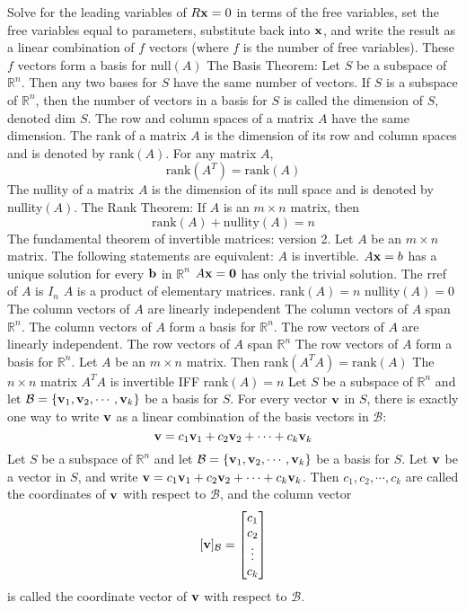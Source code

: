 \documentclass{article}
\begin{document}
\begin{outline}
            \2 Solve for the leading variables of \(R\vb x=0\) in terms of the free variables, set the free variables equal to parameters, substitute back into \(\vb x\), and write the result as a linear combination of $f$ vectors (where $f$ is the number of free variables). These $f$ vectors form a basis for null\((A)\)
        \1 The Basis Theorem: Let $S$ be a subspace of \(\mathbb R^n\). Then any two bases for $S$ have the same number of vectors. 
        \1 If $S$ is a subspace of \(\mathbb R^n\), then the number of vectors in a basis for $S$ is called the dimension of $S$, denoted dim $S$. 
        \1 The row and column spaces of a matrix $A$ have the same dimension. 
        \1 The rank of a matrix $A$ is the dimension of its row and column spaces and is denoted by rank\((A)\). 
        \1 For any matrix $A$, \[\text{rank}(A^T)=\text{rank}(A)\]
        \1 The nullity of a matrix $A$ is the dimension of its null space and is denoted by nullity\((A)\). 
        \1 The Rank Theorem: If \(A\) is an \(m\times n\) matrix, then \[\text{rank}(A)+\text{nullity}(A)=n\]
        \1 The fundamental theorem of invertible matrices: version 2. Let \(A\) be an \(m\times n\) matrix. The following statements are equivalent: 
            \2 \(A\) is invertible. 
            \2 \(A\vb x=b\) has a unique solution for every \(\vb b\) in \(\mathbb R^n\)
            \2 \(A\vb x=\vb 0\) has only the trivial solution. 
            \2 The rref of $A$  is \(I_n\)
            \2 \(A\) is a product of elementary matrices. 
            \2 rank\((A)=n\)
            \2 nullity\((A)=0\)
            \2 The column vectors of \(A\) are linearly independent 
            \2 The column vectors of \(A\) span \(\mathbb R^n\). 
            \2 The column vectors of \(A\) form a basis for \(\mathbb R^n\). 
            \2 The row vectors of \(A\) are linearly independent. 
            \2 The row vectors of \(A\) span \(\mathbb R^n\)
            \2 The row vectors of \(A\) form a basis for \(\mathbb R^n\). 
        \1 Let \(A\) be an \(m\times n\) matrix. Then 
            \2 rank\((A^TA)=\text{rank}(A)\)
            \2 The \(n\times n\) matrix \(A^TA\) is invertible IFF rank\((A)=n\)
        \1 Let $S$ be a subspace of \(\mathbb R^n\) and let \(\mathcal B=\{\vb v_1,\vb v_2,\cdots,\vb v_k\}\) be a basis for $S$. For every vector \(\vb v\) in $S$, there is exactly one way to write \(\vb v\) as a linear combination of the basis vectors in \(\mathcal B\): \[\vb v=c_1\vb v_1+c_2\vb v_2+\cdots+c_k\vb v_k\]
        \1 Let $S$ be a subspace of \(\mathbb R^n\) and let \(\mathcal B=\{\vb v_1,\vb v_2,\cdots,\vb v_k\}\) be a basis for $S$. Let \(\vb v\) be a vector in $S$, and write \(\vb v=c_1\vb v_1+c_2\vb v_2+\cdots+c_k\vb v_k\). Then \(c_1,c_2,\cdots,c_k\) are called the coordinates of \(\vb v\) with respect to \(\mathcal B\), and the column vector \[[\vb v]_\mathcal B=\begin{bmatrix}
            c_1\\c_2\\\vdots\\c_k
        \end{bmatrix}\] is called the coordinate vector of \(\vb v\) with respect to \(\mathcal B\). 
   \end{outline}
\end{document}
